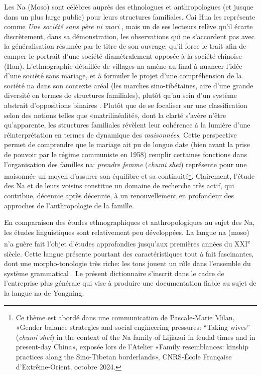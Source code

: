 Les Na (Moso) sont célèbres auprès des ethnologues et anthropologues (et jusque dans un plus large public) pour leurs structures familiales. Cai Hua les représente comme \emph{Une société sans père ni mari} \parencite{cai1997}, mais un de ses lecteurs \parencite[147]{wellens2003} relève qu'il écarte discrètement, dans sa démonstration, les observations qui ne s'accordent pas avec la généralisation résumée par le titre de son ouvrage: qu'il force le trait afin de camper le portrait d'une société diamétralement opposée à la société chinoise (Han). L'ethnographie détaillée de villages na \parencite{milan_tourisme_2019} amène au final à nuancer l'idée d'une société sans mariage, et à formuler le projet d'une compréhension de la société na dans son contexte aréal (les marches sino-tibétaines, aire d'une grande diversité en termes de structures familiales), plutôt qu'au sein d'un système abstrait d'oppositions binaires \parencite{cai2008}. Plutôt que de se focaliser sur une classification selon des notions telles que «matrilinéalité», dont la clarté s'avère n'être qu'apparente, les structures familiales révèlent leur cohérence à la lumière d'une réinterprétation en termes de dynamique des \emph{maisonnées}. Cette perspective permet de comprendre que le mariage ait pu de longue date (bien avant la prise de pouvoir par le régime communiste en 1958) remplir certaines fonctions dans l'organisation des familles na: \emph{prendre femme} (\emph{chumi shei}) représente pour une maisonnée un moyen d'assurer son équilibre et sa continuité\footnote{Ce thème est abordé dans une communication de Pascale-Marie Milan, «Gender balance strategies and social engineering pressures: “Taking wives” (\emph{chumi shei}) in the context of the Na family of Lijiazui in feudal times and in present-day China», exposée lors de l'Atelier «Family resemblances: kinship practices along the Sino-Tibetan borderlands», CNRS-École Française d'Extrême-Orient, octobre 2024.}. Clairement, l'étude des Na et de leurs voisins constitue un domaine de recherche très actif, qui contribue, décennie après décennie, à un renouvellement en profondeur des approches de l'anthropologie de la famille.

En comparaison des études ethnographiques et anthropologiques au sujet des Na, les études linguistiques sont relativement peu développées. La langue na (moso) n'a guère fait l'objet d'études approfondies jusqu'aux premières années du XXI\textsuperscript{e} siècle. Cette langue présente pourtant des caractéristiques tout à fait fascinantes, dont une morpho-tonologie très riche: les tons jouent un rôle dans l'ensemble du système grammatical \parencite{michaud2017}. Le présent dictionnaire s'inscrit dans le cadre de l'entreprise plus générale qui vise à produire une documentation fiable au sujet de la langue na de Yongning.


